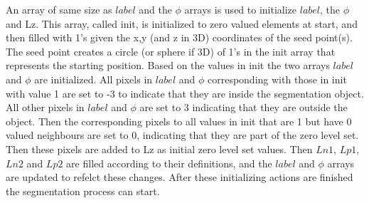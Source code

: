 An array of same size as $label$ and the $\phi$ arrays is used to initialize $label$, the $\phi$ and Lz. This array, called init, is initialized to zero valued elements at start, and then filled with 1's given the x,y (and z in 3D) coordinates of the seed point(s). The seed point creates a circle (or sphere if 3D) of 1's in the init array that represents the starting position. Based on the values in init the two arrays $label$ and $\phi$ are initialized. All pixels in $label$ and $\phi$ corresponding with those in init with value 1 are set to -3 to indicate that they are inside the segmentation object. All other pixels in $label$ and $\phi$ are set to 3 indicating that they are outside the object. Then the corresponding pixels to all values in init that are 1 but have 0 valued neighbours are set to 0, indicating that they are part of the zero level set. Then these pixels are added to Lz as initial zero level set values. Then $Ln1$, $Lp1$, $Ln2$ and $Lp2$ are filled according to their definitions, and the $label$ and $\phi$ arrays are updated to refelct these changes. After these initializing actions are finished the segmentation process can start.

